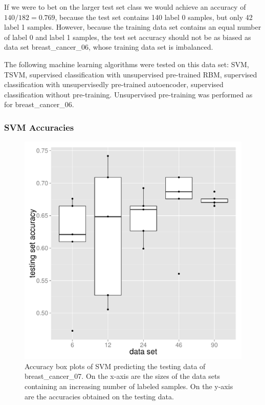 If we were to bet on the larger test set class we would achieve an
accuracy of $140/182=0.769$, because the test set contains 140 label
0 samples, but only 42 label 1 samples. However, because the training
data set contains an equal number of label 0 and label 1 samples,
the test set accuracy should not be as biased as data set breast\_cancer\_06,
whose training data set is imbalanced.

The following machine learning algorithms were tested on this data
set: SVM, TSVM, supervised classification with unsupervised pre-trained
RBM, supervised classification with unsupervisedly pre-trained autoencoder,
supervised classification without pre-training. Unsupervised pre-training
was performed as for breast\_cancer\_06.

\subsubsection{SVM Accuracies}

\begin{figure}
\begin{centering}
\includegraphics[width=0.34\paperwidth]{images/breast_cancer_07-accuracies-svm-testing.pdf}
\par\end{centering}
\caption[Accuracy box plots of SVM predicting data set breast\_cancer\_07.]{\label{fig:Accuracy-box-plots-of-SVM-on-breast_cancer_07}Accuracy
box plots of SVM predicting the testing data of breast\_cancer\_07.
On the x-axis are the sizes of the data sets containing an increasing
number of labeled samples. On the y-axis are the accuracies obtained
on the testing data.}
\end{figure}

